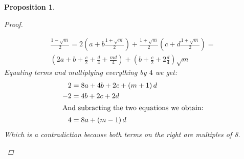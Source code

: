 \documentclass[11pt]{article}
\newtheorem{prop}{Proposition}
\theoremstyle{definition}
\begin{document}
\begin{prop}
\begin{proof}
\begin{itemize}
\begin{gather*}
                    \frac{1 - \sqrt {m}}{2} = 2\left(a+b\frac{1 + \sqrt {m}}{2}\right) + \frac{1 + \sqrt {m}}{2}\left(c+d\frac{1 + \sqrt {m}}{2}\right) = \\
                    \left(2a + b +  \frac{c}{2} + \frac{d}{4} + \frac{md}{4} \right) + \left(b + \frac{c}{2} + 2\frac{d}{4} \right) \sqrt {m}
                \end{gather*}
                Equating terms and multiplying everything by $4$ we get:
                \begin{align*}
                    2 &= 8a + 4b + 2c + (m+1)\,d \label{eqn:two} \\
                    -2 &= 4b + 2c + 2d \label{eqn:minus-one}\\
                    \intertext{And subracting the two equations we obtain:}
                    4 &= 8a + (m-1)\,d
                \end{align*}
                Which is a contradiction because both terms on the right are multiples of 8.


            \end{itemize}


        \end{proof}
    \end{prop}
\end{document}
